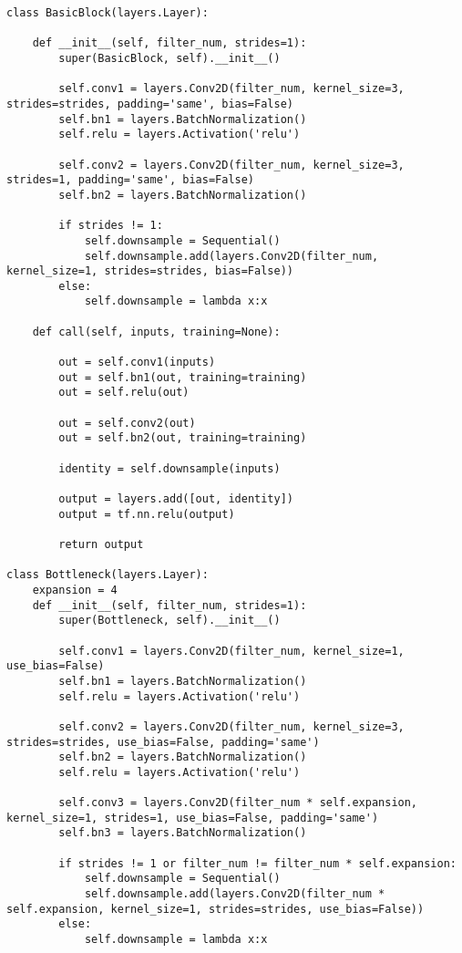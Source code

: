 \begin{verbatim}
class BasicBlock(layers.Layer):

    def __init__(self, filter_num, strides=1):
        super(BasicBlock, self).__init__()

        self.conv1 = layers.Conv2D(filter_num, kernel_size=3, strides=strides, padding='same', bias=False)
        self.bn1 = layers.BatchNormalization()
        self.relu = layers.Activation('relu')

        self.conv2 = layers.Conv2D(filter_num, kernel_size=3, strides=1, padding='same', bias=False)
        self.bn2 = layers.BatchNormalization()

        if strides != 1:
            self.downsample = Sequential()
            self.downsample.add(layers.Conv2D(filter_num, kernel_size=1, strides=strides, bias=False))
        else:
            self.downsample = lambda x:x

    def call(self, inputs, training=None):

        out = self.conv1(inputs)
        out = self.bn1(out, training=training)
        out = self.relu(out)

        out = self.conv2(out)
        out = self.bn2(out, training=training)

        identity = self.downsample(inputs)

        output = layers.add([out, identity])
        output = tf.nn.relu(output)

        return output

class Bottleneck(layers.Layer):
    expansion = 4
    def __init__(self, filter_num, strides=1):
        super(Bottleneck, self).__init__()

        self.conv1 = layers.Conv2D(filter_num, kernel_size=1, use_bias=False)
        self.bn1 = layers.BatchNormalization()
        self.relu = layers.Activation('relu')

        self.conv2 = layers.Conv2D(filter_num, kernel_size=3, strides=strides, use_bias=False, padding='same')
        self.bn2 = layers.BatchNormalization()
        self.relu = layers.Activation('relu')

        self.conv3 = layers.Conv2D(filter_num * self.expansion, kernel_size=1, strides=1, use_bias=False, padding='same')
        self.bn3 = layers.BatchNormalization()

        if strides != 1 or filter_num != filter_num * self.expansion:
            self.downsample = Sequential()
            self.downsample.add(layers.Conv2D(filter_num * self.expansion, kernel_size=1, strides=strides, use_bias=False))
        else:
            self.downsample = lambda x:x


\end{verbatim}
